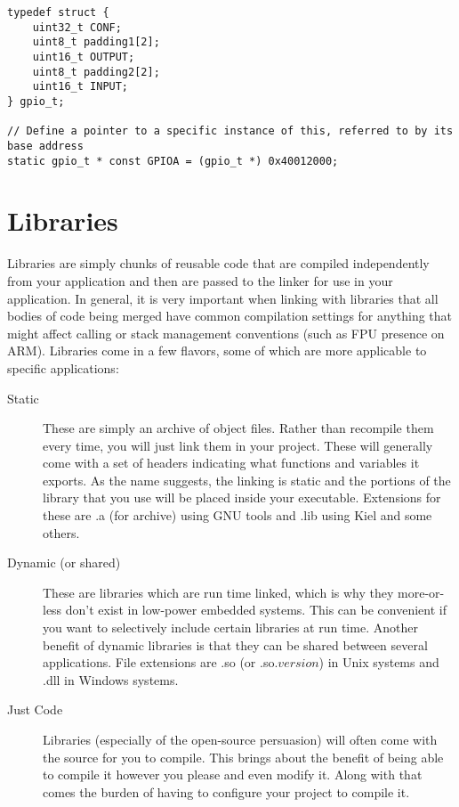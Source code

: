 \documentclass[10pt]{article}
\begin{document}
\begin{lstlisting}[label=lst-gpio-map,caption=Memory-mapped interface for GPIO port]
typedef struct {
	uint32_t CONF;
	uint8_t padding1[2];
	uint16_t OUTPUT;
	uint8_t padding2[2];
	uint16_t INPUT;
} gpio_t;

// Define a pointer to a specific instance of this, referred to by its base address
static gpio_t * const GPIOA = (gpio_t *) 0x40012000;
\end{lstlisting}


\section{Libraries}

Libraries are simply chunks of reusable code that are compiled independently from your application and then are passed to the linker for use in your application. In general, it is very important when linking with libraries that all bodies of code being merged have common compilation settings for anything that might affect calling or stack management conventions (such as FPU presence on ARM). Libraries come in a few flavors, some of which are more applicable to specific applications:

\begin{description}
\item[Static] These are simply an archive of object files. Rather than recompile them every time, you will just link them in your project.
These will generally come with a set of headers indicating what functions and variables it exports. As the name suggests, the linking is static and the portions of the library that you use will be placed inside your executable. Extensions for these are .a (for archive) using GNU tools and .lib using Kiel and some others.

\item[Dynamic (or shared)] These are libraries which are run time linked, which is why they more-or-less don't exist in low-power embedded systems. This can be convenient if you want to selectively include certain libraries at run time. Another benefit of dynamic libraries is that they can be shared between several applications. File extensions are .so (or .so.$version$) in Unix systems and .dll in Windows systems.

\item[Just Code] Libraries (especially of the open-source persuasion) will often come with the source for you to compile. This brings about the benefit of being able to compile it however you please and even modify it. Along with that comes the burden of having to configure your project to compile it.

\end{description}
\end{document}
